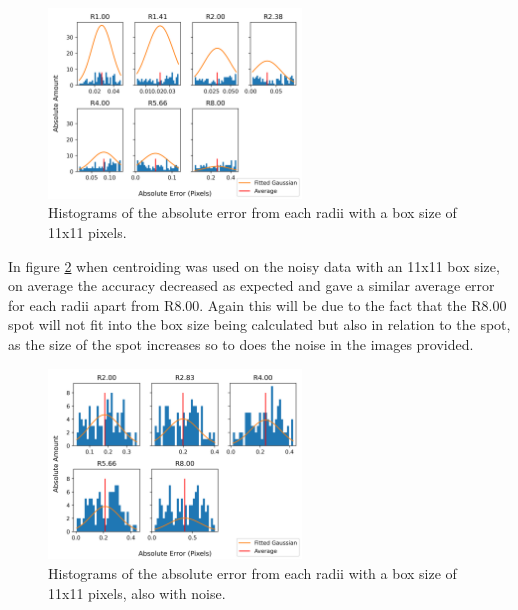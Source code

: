 \documentclass[aps,pra,a4paper,nofootinbib,onecolumn,tightenlines,longbibliography,12pt,amsfonts,amssymb,amsmath,floatfix]{revtex4-2} %
\begin{document}
  \begin{figure}[H]
    \begin{center}
      \includegraphics[width=0.6\textwidth]{project_pics/distro_centriod_11.png}
    \end{center}
    \caption{Histograms of the absolute error from each radii with a box size of 11x11 pixels.}
    \label{fig:box_11}
  \end{figure}
  
  In figure \ref{fig:box_11_noise} when centroiding was used on the noisy data with an 11x11 box size, 
  on average the accuracy decreased as expected and gave a similar average error for each radii apart from R8.00. 
  Again this will be due to the fact that the R8.00 spot will not fit into the box size being calculated 
  but also in relation to the spot, as the size of the spot increases so to does the noise in the images 
  provided.


  \begin{figure}[H]
    \begin{center}
      \includegraphics[width=0.6\textwidth]{project_pics/noise_cen_scatter_11.png}
    \end{center}
    \caption{Histograms of the absolute error from each radii with a box size of 11x11 pixels, also with noise.}
    \label{fig:box_11_noise}
  \end{figure}
  
\end{document}
